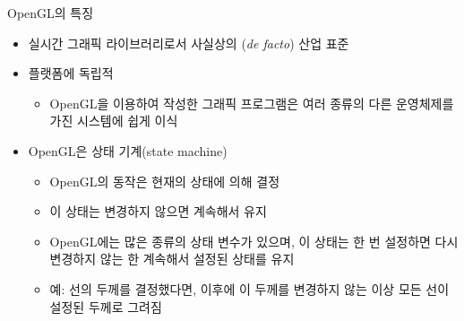 \documentclass{beamer}
\begin{document}
\begin{frame}{OpenGL의 특징}

\begin{itemize}
\item 실시간 그래픽 라이브러리로서 사실상의 ({\it de facto}) 산업 표준
\item 플랫폼에 독립적
	\begin{itemize}
	\item OpenGL을 이용하여 작성한 그래픽 프로그램은 여러 종류의 다른 운영체제를 가진 시스템에 쉽게 이식
	\end{itemize}
\item OpenGL은 상태 기계(state machine)
	\begin{itemize}
	\item OpenGL의 동작은 현재의 상태에 의해 결정
	\item 이 상태는 변경하지 않으면 계속해서 유지
	\item OpenGL에는 많은 종류의 상태 변수가 있으며, 이 상태는 한 번 설정하면 다시 변경하지 않는 한 계속해서 설정된 상태를 유지
	\item 예: 선의 두께를 결정했다면, 이후에 이 두께를 변경하지 않는 이상 모든 선이 설정된 두께로 그려짐	
	\end{itemize}
\end{itemize}

\end{frame}
\end{document}
